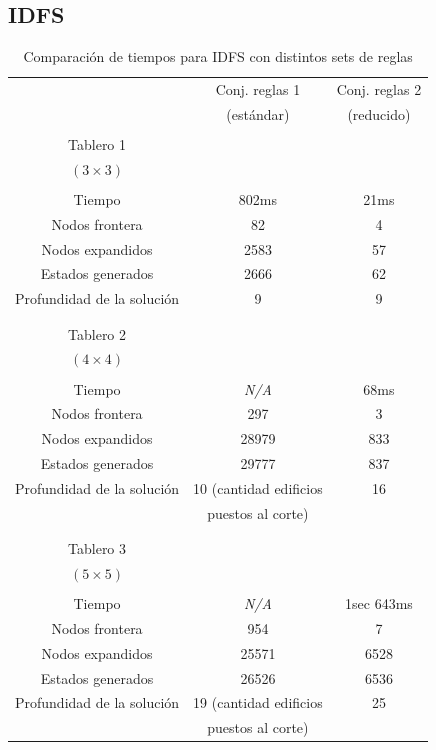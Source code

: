 \documentclass[%
    final,
    reprint,
    notitlepage,
    narroweqnarray,
    inline,
    twoside,
    invited
    ]{ieee}
\begin{document}
\clearpage

\subsection{IDFS}

\begin{table}[H]
\begin{center}
\begin{tabular}{|c|c|c|}
\hline
 & Conj. reglas 1 &  Conj. reglas 2\\
 & (estándar) &  (reducido)\\

\hline
\hline

&&\\
Tablero 1 & & \\
$(3\times 3)$ & & \\
&&\\
\hline
Tiempo & 802ms & 21ms \\
\hline
Nodos frontera & 82 & 4 \\
\hline
Nodos expandidos & 2583 & 57 \\
\hline
Estados generados & 2666 & 62 \\
\hline
Profundidad de la solución & 9 & 9 \\
\hline
&&\\

\hline
\hline

&&\\
Tablero 2 & & \\
$(4\times 4)$ & & \\
&&\\
\hline
Tiempo & \textit{N/A} & 68ms \\
\hline
Nodos frontera & 297 & 3 \\
\hline
Nodos expandidos & 28979 & 833 \\
\hline
Estados generados & 29777 & 837 \\
\hline
Profundidad de la solución & 10 (cantidad edificios  & 16 \\
&puestos al corte)&\\
\hline
&&\\

\hline
\hline

&&\\
Tablero 3 & & \\
$(5\times 5)$ & & \\
&&\\
\hline
Tiempo & \textit{N/A} & 1sec 643ms \\
\hline
Nodos frontera & 954 & 7 \\
\hline
Nodos expandidos & 25571 & 6528 \\
\hline
Estados generados & 26526 & 6536 \\
\hline
Profundidad de la solución & 19 (cantidad edificios  & 25 \\
&puestos al corte)&\\

\hline  
\end{tabular}
\end{center}
\caption{Comparación de tiempos para IDFS con distintos sets de reglas}\label{tablaIDFS}
\end{table}
\end{document}
